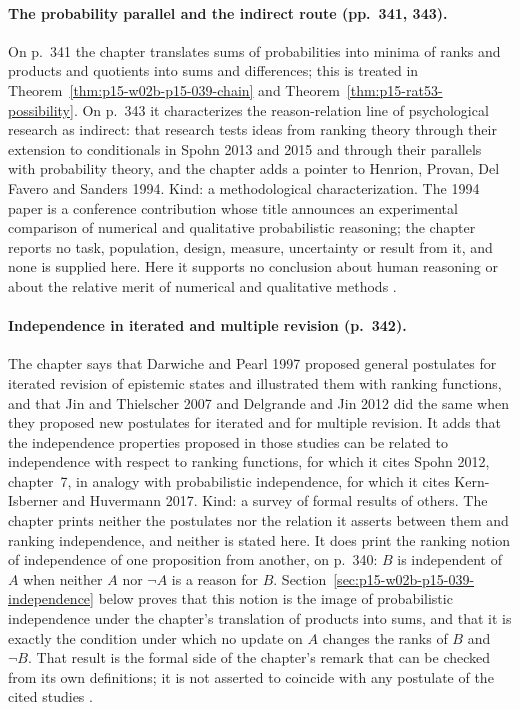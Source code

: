 \paragraph{The probability parallel and the indirect route (pp.~341, 343).}
On p.~341 the chapter translates sums of probabilities into minima of ranks
and products and quotients into sums and differences; this is treated
in Theorem~\ref{thm:p15-w02b-p15-039-chain} and
Theorem~\ref{thm:p15-rat53-possibility}.  On p.~343 it characterizes the
reason-relation line of psychological research as indirect: that research
tests ideas from ranking theory through their extension to conditionals in
Spohn 2013 and 2015 and through their parallels with probability theory, and
the chapter adds a pointer to Henrion, Provan, Del Favero and Sanders 1994.
Kind: a methodological characterization.  The 1994 paper is a conference
contribution whose title announces an experimental comparison of numerical
and qualitative probabilistic reasoning; the chapter reports no task,
population, design, measure, uncertainty or result from it, and none is
supplied here.  Here it supports no conclusion about human
reasoning or about the relative merit of numerical and qualitative methods
\parencite[pp.~341, 343]{KernIsbernerSkovgaardOlsenSpohn2021Ranking}.

\paragraph{Independence in iterated and multiple revision (p.~342).}
The chapter says that Darwiche and Pearl 1997 proposed general postulates for
iterated revision of epistemic states and illustrated them with ranking
functions, and that Jin and Thielscher 2007 and Delgrande and Jin 2012 did
the same when they proposed new postulates for iterated and for multiple
revision.  It adds that the independence properties proposed in those studies
can be related to independence with respect to ranking functions, for which
it cites Spohn 2012, chapter~7, in analogy with probabilistic independence,
for which it cites Kern-Isberner and Huvermann 2017.  Kind: a survey of
formal results of others.  The chapter prints neither the postulates nor the
relation it asserts between them and ranking independence, and neither is
stated here.  It does print the ranking notion of independence of one
proposition from another, on p.~340: \(B\) is independent of \(A\) when
neither \(A\) nor \(\neg A\) is a reason for \(B\).  Section~\ref{sec:p15-w02b-p15-039-independence}
below proves that this notion is the image of probabilistic independence
under the chapter's translation of products into sums, and that it is
exactly the condition under which no update on \(A\) changes the ranks of
\(B\) and \(\neg B\).  That result is the formal side of the chapter's
remark that can be checked from its own definitions; it is not asserted to
coincide with any postulate of the cited studies
\parencite[pp.~340, 342]{KernIsbernerSkovgaardOlsenSpohn2021Ranking}.

